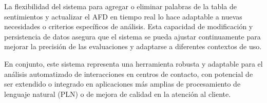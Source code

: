 \documentclass[12pt,a4paper]{article}
\begin{document}
La flexibilidad del sistema para agregar o eliminar palabras de la tabla de sentimientos y actualizar el AFD en tiempo real lo hace adaptable a nuevas necesidades o criterios específicos de análisis. Esta capacidad de modificación y persistencia de datos asegura que el sistema se pueda ajustar continuamente para mejorar la precisión de las evaluaciones y adaptarse a diferentes contextos de uso.

En conjunto, este sistema representa una herramienta robusta y adaptable para el análisis automatizado de interacciones en centros de contacto, con potencial de ser extendido o integrado en aplicaciones más amplias de procesamiento de lenguaje natural (PLN) o de mejora de calidad en la atención al cliente.
\end{document}
